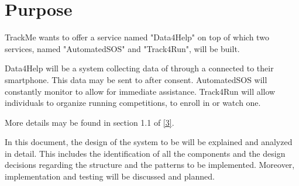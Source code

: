 \documentclass[../../DD.tex]{subfiles}
\begin{document}
\section{Purpose}
	TrackMe wants to offer a service named "Data4Help" on top of which two services, named "AutomatedSOS" and "Track4Run", will be built.

	Data4Help will be a system collecting data of  through a  connected to their smartphone. This data may be sent to  after  consent.
	AutomatedSOS will constantly monitor  to allow for immediate assistance.
	Track4Run will allow individuals to organize running competitions, to enroll in or watch one.

	More details may be found in section 1.1 of \hyperref[ref:3]{[3]}.

	In this document, the design of the system to be will be explained and analyzed in detail. This includes the identification of all the components and the design decisions regarding the structure and the patterns to be implemented. Moreover, implementation and testing will be discussed and planned.
\end{document}
